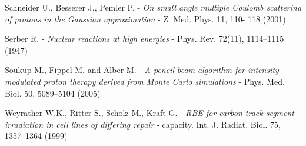 \documentclass[12pt, a4paper, twoside]{book}
\begin{document}
\begin{thebibliography}{99}
Schneider U., Besserer J., Pemler P. - 
\emph{On small angle multiple Coulomb scattering of protons in the Gaussian approximation} - 
Z. Med. Phys. 11,  110- 118 (2001)

Serber R. - 
\emph{Nuclear reactions at high energies} -
Phys. Rev. 72(11), 1114–1115 (1947)

Soukup M., Fippel M. and Alber M. -
\emph{A pencil beam algorithm for intensity modulated proton therapy derived from Monte Carlo simulations} -
Phys. Med. Biol. 50, 5089–5104 (2005)

Weyrather W.K., Ritter S., Scholz M., Kraft G. - 
\emph{RBE for carbon track-segment irradiation in cell lines of differing repair} -
capacity. Int. J. Radiat. Biol. 75, 1357–1364 (1999)





\end{thebibliography}




\end{document}
